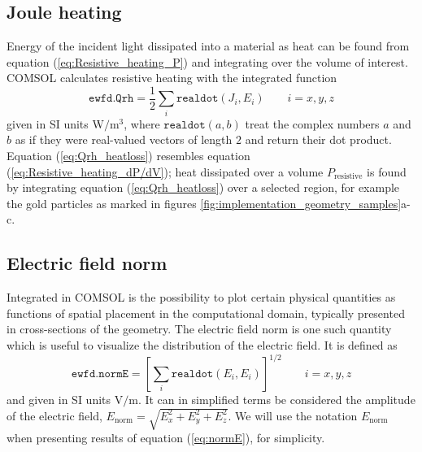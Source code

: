 \subsection{Joule heating}
Energy of the incident light dissipated into a material as heat can be found from equation (\ref{eq:Resistive_heating_P}) and integrating over the volume of interest. COMSOL calculates resistive heating with the integrated function 
\begin{equation}
    \texttt{ewfd.Qrh} = \frac{1}{2}\sum_i \texttt{realdot}(J_i,E_i) \quad\quad i=x,y,z
    \label{eq:Qrh_heatloss}
\end{equation}
given in SI units W$/$m$^3$, where $\texttt{realdot}(a,b)$ treat the complex numbers $a$ and $b$ as if they were real-valued vectors of length $2$ and return their dot product\cite{comsol_referencemanual}. Equation (\ref{eq:Qrh_heatloss}) resembles equation (\ref{eq:Resistive_heating_dP/dV}); heat dissipated over a volume $P_{\text{resistive}}$ is found by integrating equation (\ref{eq:Qrh_heatloss}) over a selected region, for example the gold particles as marked in figures \ref{fig:implementation_geometry_samples}a-c.

\subsection{Electric field norm}
Integrated in COMSOL is the possibility to plot certain physical quantities as functions of spatial placement in the computational domain, typically presented in cross-sections of the geometry. The electric field norm is one such quantity which is useful to visualize the distribution of the electric field. It is defined as
\begin{equation}
    \texttt{ewfd.normE} = \left [ \sum_i \texttt{realdot}(E_i,E_i) \right ]^{1/2} \quad\quad i=x,y,z
    \label{eq:normE}
\end{equation}
and given in SI units V$/$m. It can in simplified terms be considered the amplitude of the electric field, $E_\text{norm}=\sqrt{E_x^2+E_y^2+E_z^2}$. We will use the notation $E_\text{norm}$ when presenting results of equation (\ref{eq:normE}), for simplicity.


